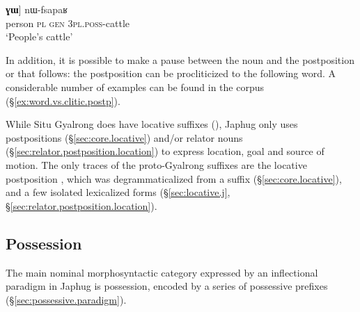 \begin{exe}
\ex \label{ex:ra.GW.nWfsapaR}
\gll [[tɯrme ra] \textbf{ɣɯ}] nɯ-fsapaʁ \\
person \textsc{pl} \textsc{gen} \textsc{3pl}.\textsc{poss}-cattle \\
\glt `People's cattle' 
\end{exe}

In addition, it is possible to make a pause between the noun and the postposition  or  that follows: the postposition can be procliticized to the following word. A considerable number of examples can be found in the corpus (§\ref{ex:word.vs.clitic.postp}).

While Situ Gyalrong does have locative suffixes (\citealt[325--331]{linxr93jiarong}), Japhug only uses postpositions (§\ref{sec:core.locative}) and/or relator nouns (§\ref{sec:relator.postposition.location}) to express location, goal and source of motion. The only traces of the proto-Gyalrong suffixes are the locative postposition , which was degrammaticalized from a suffix  (§\ref{sec:core.locative}), and a few isolated lexicalized forms (§\ref{sec:locative.j}, §\ref{sec:relator.postposition.location}).

\subsection{Possession}
The main nominal morphosyntactic category expressed by an inflectional paradigm in Japhug is possession, encoded by a series of possessive prefixes  (§\ref{sec:possessive.paradigm}).

